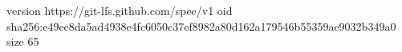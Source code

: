 version https://git-lfs.github.com/spec/v1
oid sha256:e49ec8da5ad4938e4fc6050c37ef8982a80d162a179546b55359ae9032b349a0
size 65
